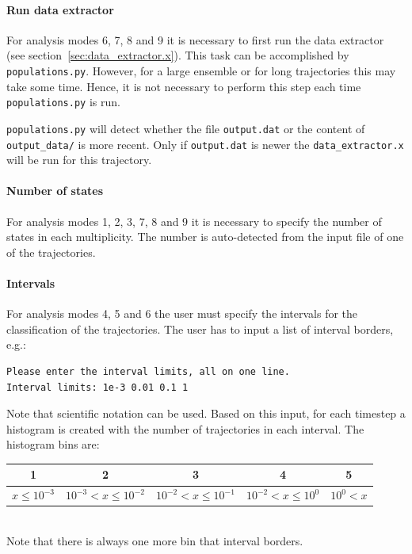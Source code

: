 \documentclass[a4paper,11pt,DIV=15,openany,twoside=false]{scrbook}
\newcommand{\ttt}[1]{\texttt{#1}}
\begin{document}
\paragraph{Run data extractor}

For analysis modes 6, 7, 8 and 9 it is necessary to first run the data extractor (see section~\ref{sec:data_extractor.x}). This task can be accomplished by \ttt{populations.py}. However, for a large ensemble or for long trajectories this may take some time. Hence, it is not necessary to perform this step each time \ttt{populations.py} is run. 

\ttt{populations.py} will detect whether the file \ttt{output.dat} or the content of \ttt{output\_data/} is more recent. Only if \ttt{output.dat} is newer the \ttt{data\_extractor.x} will be run for this trajectory.

\paragraph{Number of states}

For analysis modes 1, 2, 3, 7, 8 and 9 it is necessary to specify the number of states in each multiplicity. The number is auto-detected from the input file of one of the trajectories.

\paragraph{Intervals}

For analysis modes 4, 5 and 6 the user must specify the intervals for the classification of the trajectories. The user has to input a list of interval borders, e.g.:
\begin{verbatim}
Please enter the interval limits, all on one line.
Interval limits: 1e-3 0.01 0.1 1
\end{verbatim}
Note that scientific notation can be used. Based on this input, for each timestep a histogram is created with the number of trajectories in each interval. The histogram bins are:

\begin{tabular}{ccccc}
  \toprule
  1&2&3&4&5\\
  \midrule
  $x\leq10^{-3}$     &$10^{-3}<x\leq10^{-2}$ &$10^{-2}<x\leq10^{-1}$ &$10^{-2}<x\leq10^{0}$ &$10^{0}<x$\\
  \bottomrule
\end{tabular}\\
Note that there is always one more bin that interval borders.
\end{document}
